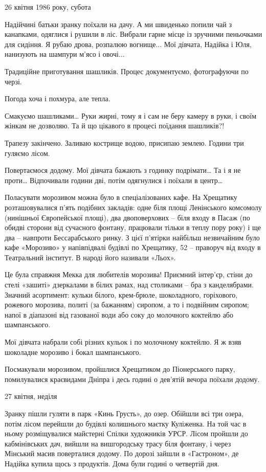 26 квітня 1986 року, субота 

Надійчині батьки зранку поїхали на дачу. А ми швиденько попили чай з канапками,
одяглися і рушили в ліс. Вибрали гарне місце із зручними пеньочками для
сидіння. Я рубаю дрова, розпалюю вогнище... Мої дівчата, Надійка і Юля, нанизують
на шампури м’ясо і овочі...

Традиційне приготування шашликів. Процес документуємо, фотографуючи по черзі.

Погода хоча і похмура, але тепла. 

Смакуємо шашликами… Руки жирні, тому я і сам не беру камеру в руки, і своїм
жінкам не дозволяю. Та й що цікавого в процесі поїдання шашликів?!

Трапезу закінчено. Заливаю кострище водою, присипаю землею. Години три гуляємо
лісом.

Повертаємося додому. Мої дівчата бажають з годинку подрімати… Та і я не проти…
Відпочивали години дві, потім одягнулися і поїхали в центр… 

Поласувати морозивом можна було в спеціалізованих кафе. На Хрещатику
розташовувалися п'ять подібних закладів: одне біля площі Ленінського комсомолу
(нинішньої Європейської площі), два двоповерхових – біля входу в Пасаж (по
обидві сторони від сучасного фонтану, працювали тільки в теплу пору року) і ще
два – навпроти Бессарабського ринку. З цієї п'ятірки найбільш незвичайним було
кафе «Морозиво» у напівпідвалі будівлі по Хрещатику, 52 – праворуч від входу в
Театральний інститут. В народі його називали «Льох».

Це була справжня Мекка для любителів морозива! Приємний інтер'єр, стіни до
стелі «зашиті» дзеркалами в білих рамах, над столиками – бра з канделябрами.
Значний асортимент: кульки білого, крем-брюле, шоколадного, горіхового,
рожевого морозива, политі (за бажанням) сиропом, а то і подвійним сиропом;
напої в діапазоні від газованої води або соку до молочного коктейлю або
шампанського. 

Мої дівчата набрали собі різних кульок і по молочному коктейлю. Я ж взяв
шоколадне морозиво і бокал шампанського. 

Посмакували морозивом, пройшлися Хрещатиком до Піонерського парку, помилувалися
краєвидами Дніпра і десь годині о дев’ятій вечора поїхали додому.

27 квітня, неділя 

Зранку пішли гуляти в парк «Кинь Грусть», до озер. Обійшли всі три озера, потім
лісом перейшли до будівлі колишнього маєтку Куліженка. На той час в ньому
розміщувалися майстерні Спілки художників УРСР. Лісом пройшли до кабмінівських
дач, вийшли на вишгородську трасу біля фонтану, і через Мінський масив
поверталися додому. По дорозі зайшли в «Гастроном», де Надійка купила щось з
продуктів. Дома були годині о четвертій дня. 

